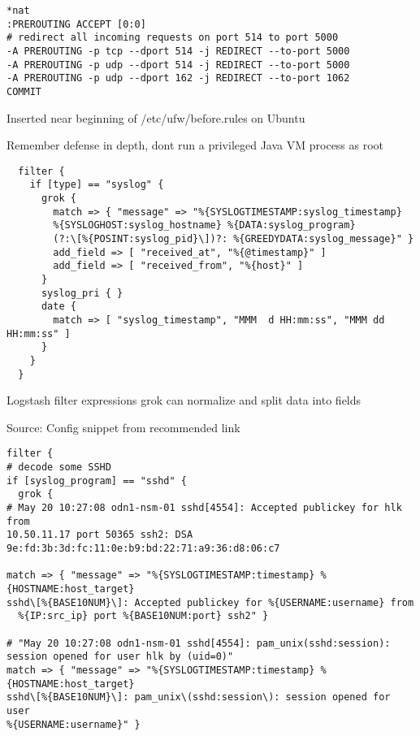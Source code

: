 \documentclass[Screen16to9,17pt]{foils}
\begin{document}

{\footnotesize
\begin{verbatim}
*nat
:PREROUTING ACCEPT [0:0]
# redirect all incoming requests on port 514 to port 5000
-A PREROUTING -p tcp --dport 514 -j REDIRECT --to-port 5000
-A PREROUTING -p udp --dport 514 -j REDIRECT --to-port 5000
-A PREROUTING -p udp --dport 162 -j REDIRECT --to-port 1062
COMMIT
\end{verbatim}
}

\centerline{Inserted near beginning of /etc/ufw/before.rules on Ubuntu}

Remember defense in depth, dont run a privileged Java VM process as root \smiley


{\footnotesize
\begin{verbatim}
  filter {
    if [type] == "syslog" {
      grok {
        match => { "message" => "%{SYSLOGTIMESTAMP:syslog_timestamp}
        %{SYSLOGHOST:syslog_hostname} %{DATA:syslog_program}
        (?:\[%{POSINT:syslog_pid}\])?: %{GREEDYDATA:syslog_message}" }
        add_field => [ "received_at", "%{@timestamp}" ]
        add_field => [ "received_from", "%{host}" ]
      }
      syslog_pri { }
      date {
        match => [ "syslog_timestamp", "MMM  d HH:mm:ss", "MMM dd HH:mm:ss" ]
      }
    }
  }
\end{verbatim}
}

\begin{list2}
\item Logstash filter expressions grok can normalize and split data into fields
\end{list2}

Source:
Config snippet from recommended link\\
{\small{}}



{\footnotesize
\begin{verbatim}
filter {
# decode some SSHD
if [syslog_program] == "sshd" {
  grok {
# May 20 10:27:08 odn1-nsm-01 sshd[4554]: Accepted publickey for hlk from
10.50.11.17 port 50365 ssh2: DSA 9e:fd:3b:3d:fc:11:0e:b9:bd:22:71:a9:36:d8:06:c7

match => { "message" => "%{SYSLOGTIMESTAMP:timestamp} %{HOSTNAME:host_target}
sshd\[%{BASE10NUM}\]: Accepted publickey for %{USERNAME:username} from
  %{IP:src_ip} port %{BASE10NUM:port} ssh2" }

# "May 20 10:27:08 odn1-nsm-01 sshd[4554]: pam_unix(sshd:session):
session opened for user hlk by (uid=0)"
match => { "message" => "%{SYSLOGTIMESTAMP:timestamp} %{HOSTNAME:host_target}
sshd\[%{BASE10NUM}\]: pam_unix\(sshd:session\): session opened for user
%{USERNAME:username}" }
\end{verbatim}
}
\end{document}
